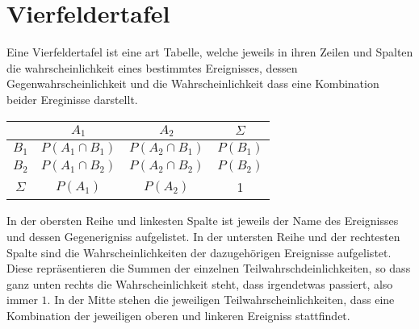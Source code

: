 \documentclass{article}
\begin{document}
 
\section{Vierfeldertafel}
\begin{minipage}{\dimexpr\linewidth-8cm} 
 Eine Vierfeldertafel ist eine art Tabelle, welche jeweils in ihren Zeilen und Spalten die wahrscheinlichkeit eines bestimmtes Ereignisses, dessen Gegenwahrscheinlichkeit und die Wahrscheinlichkeit dass eine Kombination beider Ereginisse darstellt.
 
\end{minipage}
\hfill
\begin{minipage}{8cm}
 \center
 \begin{tabular}{ |c|c|c|c| }
  \hline
        & $A_1$ & $A_2$ & $\Sigma$ \\
  \hline
  $B_1$ & $P(A_1 \cap B_1)$ & $P(A_2 \cap B_1)$ & $P(B_1)$ \\
  \hline
  $B_2$ & $P(A_1 \cap B_2)$ & $P(A_2 \cap B_2)$ & $P(B_2)$ \\
  \hline
  $\Sigma$ & $P(A_1)$ & $P(A_2)$ & 1 \\
  \hline
 \end{tabular}
\end{minipage}
In der obersten Reihe und linkesten Spalte ist jeweils der Name des Ereignisses und dessen Gegenerigniss aufgelistet. In der untersten Reihe und der rechtesten Spalte sind die Wahrscheinlichkeiten der dazugehörigen Ereignisse aufgelistet. Diese repräsentieren die Summen der einzelnen Teilwahrschdeinlichkeiten, so dass ganz unten rechts die Wahrscheinlichkeit steht, dass irgendetwas passiert, also immer $1$. \newline
In der Mitte stehen die jeweiligen Teilwahrscheinlichkeiten, dass eine Kombination der jeweiligen oberen und linkeren Ereigniss stattfindet. 
\end{document}
